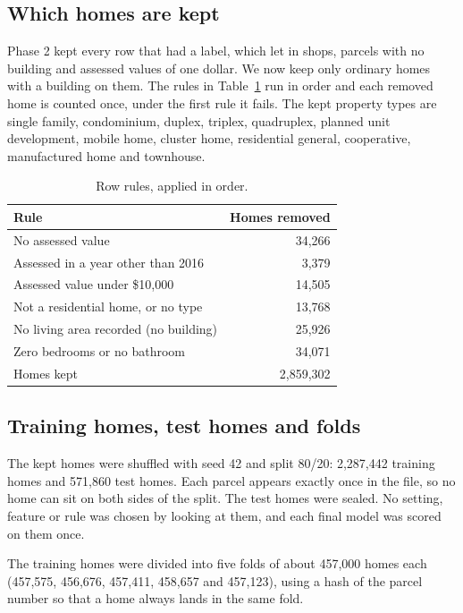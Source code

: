 \documentclass[sigconf,nonacm,10pt]{acmart}
\begin{document}
\subsection{Which homes are kept}
Phase 2 kept every row that had a label, which let in shops, parcels with no building and assessed values of one dollar. We now keep only ordinary homes with a building on them. The rules in Table~\ref{tab:rows} run in order and each removed home is counted once, under the first rule it fails. The kept property types are single family, condominium, duplex, triplex, quadruplex, planned unit development, mobile home, cluster home, residential general, cooperative, manufactured home and townhouse.

\begin{table}[t]
\caption{Row rules, applied in order.}
\label{tab:rows}
\small
\begin{tabular}{@{}lr@{}}
\toprule
Rule & Homes removed \\
\midrule
No assessed value & 34,266 \\
Assessed in a year other than 2016 & 3,379 \\
Assessed value under \$10,000 & 14,505 \\
Not a residential home, or no type & 13,768 \\
No living area recorded (no building) & 25,926 \\
Zero bedrooms or no bathroom & 34,071 \\
\midrule
Homes kept & 2,859,302 \\
\bottomrule
\end{tabular}
\end{table}

\subsection{Training homes, test homes and folds}
The kept homes were shuffled with seed 42 and split 80/20: 2,287,442 training homes and 571,860 test homes. Each parcel appears exactly once in the file, so no home can sit on both sides of the split. The test homes were sealed. No setting, feature or rule was chosen by looking at them, and each final model was scored on them once.

The training homes were divided into five folds of about 457,000 homes each (457,575, 456,676, 457,411, 458,657 and 457,123), using a hash of the parcel number so that a home always lands in the same fold.
\end{document}
